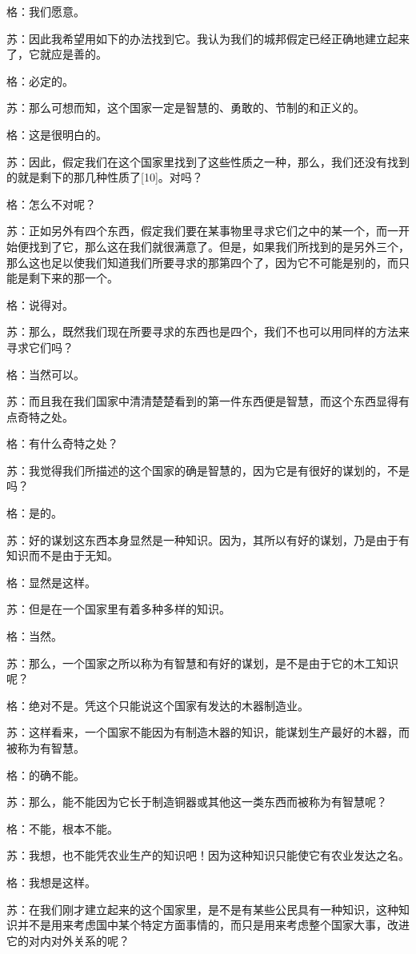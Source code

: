 \documentclass[12pt,oneside]{book}
\begin{document}
格：我们愿意。

苏：因此我希望用如下的办法找到它。我认为我们的城邦假定已经正确地建立起来了，它就应是善的。

格：必定的。

苏：那么可想而知，这个国家一定是智慧的、勇敢的、节制的和正义的。

格：这是很明白的。

苏：因此，假定我们在这个国家里找到了这些性质之一种，那么，我们还没有找到的就是剩下的那几种性质了[10]。对吗？

格：怎么不对呢？

苏：正如另外有四个东西，假定我们要在某事物里寻求它们之中的某一个，而一开始便找到了它，那么这在我们就很满意了。但是，如果我们所找到的是另外三个，那么这也足以使我们知道我们所要寻求的那第四个了，因为它不可能是别的，而只能是剩下来的那一个。

格：说得对。

苏：那么，既然我们现在所要寻求的东西也是四个，我们不也可以用同样的方法来寻求它们吗？

格：当然可以。

苏：而且我在我们国家中清清楚楚看到的第一件东西便是智慧，而这个东西显得有点奇特之处。

格：有什么奇特之处？

苏：我觉得我们所描述的这个国家的确是智慧的，因为它是有很好的谋划的，不是吗？

格：是的。

苏：好的谋划这东西本身显然是一种知识。因为，其所以有好的谋划，乃是由于有知识而不是由于无知。

格：显然是这样。

苏：但是在一个国家里有着多种多样的知识。

格：当然。

苏：那么，一个国家之所以称为有智慧和有好的谋划，是不是由于它的木工知识呢？

格：绝对不是。凭这个只能说这个国家有发达的木器制造业。

苏：这样看来，一个国家不能因为有制造木器的知识，能谋划生产最好的木器，而被称为有智慧。

格：的确不能。

苏：那么，能不能因为它长于制造铜器或其他这一类东西而被称为有智慧呢？

格：不能，根本不能。

苏：我想，也不能凭农业生产的知识吧！因为这种知识只能使它有农业发达之名。

格：我想是这样。

苏：在我们刚才建立起来的这个国家里，是不是有某些公民具有一种知识，这种知识并不是用来考虑国中某个特定方面事情的，而只是用来考虑整个国家大事，改进它的对内对外关系的呢？
\end{document}
